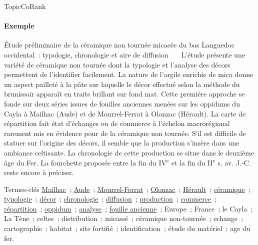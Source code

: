 \begin{frame}{TopicCoRank}\framesubtitle{Exemple}
  \vspace{-.33em}
  \begin{exampleblock}{\small
    Étude préliminaire de la céramique non tournée micacée du bas Languedoc
    occidental~: typologie, chronologie et aire de diffusion
  }\justifying\small
    ~~~L'étude présente une variété de céramique non tournée dont la typologie
    et l'analyse des décors permettent de l'identifier facilement. La nature de
    l'argile enrichie de mica donne un aspect pailleté à la pâte sur laquelle le
    décor effectué selon la méthode du brunissoir apparaît en traits brillant
    sur fond mat. Cette première approche se fonde sur deux séries issues de
    fouilles anciennes menées sur les oppidums du Cayla à Mailhac (Aude) et de
    Mourrel-Ferrat à Olonzac (Hérault). La carte de répartition fait état
    d'échanges ou de commerce à l'échelon macrorégional rarement mis en évidence
    pour de la céramique non tournée. S'il est difficile de statuer sur
    l'origine des décors, il semble que la production s'insère dans une ambiance
    celtisante. La chronologie de cette production se situe dans le deuxième âge
    du Fer. La fourchette proposée entre la fin du IV$^\text{e}$ et la fin du
    II$^\text{e}$ s. av. J.-C. reste encore à préciser.

    \begin{exampleblock}{\small Termes-clés}\justifying\small
      \underline{Mailhac}~; \underline{Aude}~; \underline{Mourrel-Ferrat}~;
      \underline{Olonzac}~; \underline{Hérault}~; \underline{céramique}~;
      \underline{typologie}~; \underline{décor}~; \underline{chronologie}~;
      \underline{diffusion}~; \underline{production}~; \underline{commerce}~;
      \underline{répartition}~; \underline{oppidum}~; \underline{analyse}~;
      \underline{fouille ancienne}~; Europe~; France~; le Cayla~; La Tène~;
      celtes~; distribution~; micassé~; céramique non-tournée~; echange~;
      cartographie~; habitat~; site fortifié~; identification~; étude du
      matériel~; age du fer.
    \end{exampleblock}
  \end{exampleblock}
\end{frame}


